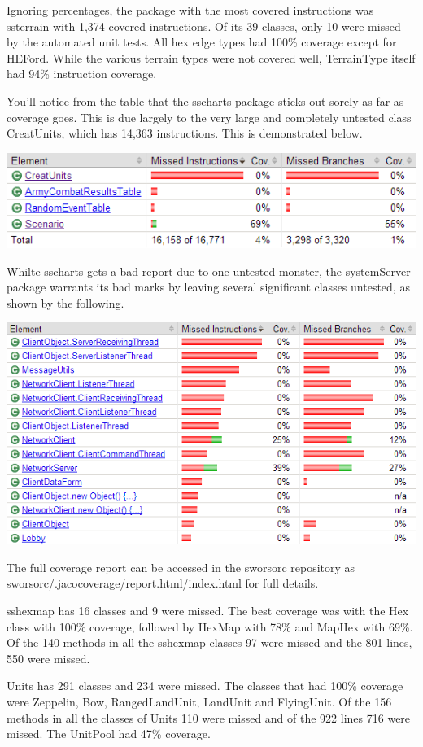\documentclass[12pt,a4paper,titlepage]{article}
\begin{document}
Ignoring percentages, the package with the most covered instructions was ssterrain with 
1,374 covered instructions. Of its 39 classes, only 10 were missed by the automated 
unit tests. All hex edge types had 100\% coverage except for HEFord. While the various 
terrain types were not covered well, TerrainType itself had 94\% instruction coverage.

You'll notice from the table that the sscharts package sticks out sorely as far as coverage 
goes. This is due largely to the very large and completely untested class CreatUnits, which 
has 14,363 instructions. This is demonstrated below.

\includegraphics{sscharts_coverage}

Whilte sscharts gets a bad report due to one untested monster, the systemServer package 
warrants its bad marks by leaving several significant classes untested, as shown by the 
following.

\includegraphics{systemServer_coverage}

The full coverage report can be accessed in the sworsorc repository as sworsorc/.jacocoverage/report.html/index.html for full details.

sshexmap has 16 classes and 9 were missed.  The best coverage was with the Hex class with 
100\% coverage, followed by HexMap with 78\% and MapHex with 69\%. Of the 140 methods in all 
the sshexmap classes 97 were missed and the 801 lines, 550 were missed.

Units has 291 classes and 234 were missed.  The classes that had 100\% coverage were Zeppelin, 
Bow, RangedLandUnit, LandUnit and FlyingUnit.  Of the 156 methods in all the classes of Units 
110 were missed and of the 922 lines 716 were missed.  The UnitPool had 47\% coverage.
\end{document}
